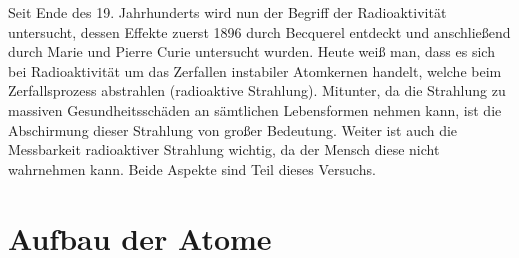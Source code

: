 Seit Ende des 19. Jahrhunderts wird nun der Begriff der Radioaktivität untersucht, dessen Effekte zuerst 1896 durch Becquerel entdeckt und anschließend durch Marie und Pierre Curie untersucht wurden. Heute weiß man, dass es sich bei Radioaktivität um das Zerfallen instabiler Atomkernen handelt, welche beim Zerfallsprozess abstrahlen (radioaktive Strahlung). Mitunter, da die Strahlung zu massiven Gesundheitsschäden an sämtlichen Lebensformen nehmen kann, ist die Abschirmung dieser Strahlung von großer Bedeutung. Weiter ist auch die Messbarkeit radioaktiver Strahlung wichtig, da der Mensch diese nicht wahrnehmen kann. Beide Aspekte sind Teil dieses Versuchs. \cite{HW03}

\section{Aufbau der Atome}


